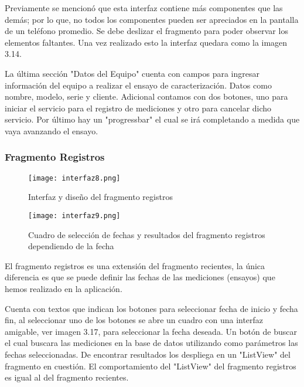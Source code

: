 \par \noindent
Previamente se mencionó que esta interfaz contiene más componentes que las demás; por lo que, no todos los componentes pueden ser apreciados en la pantalla de un teléfono promedio. Se debe deslizar el fragmento para poder observar los elementos faltantes. Una vez realizado esto la interfaz quedara como la imagen 3.14. 

\par \noindent
La última sección "Datos del Equipo" cuenta con campos para ingresar información del equipo a realizar el ensayo de caracterización. Datos como nombre, modelo, serie y cliente. Adicional contamos con dos botones, uno para iniciar el servicio para el registro de mediciones y otro para cancelar dicho servicio. Por último hay un "progressbar" el cual se irá completando a medida que vaya avanzando el ensayo.

\subsubsection{Fragmento Registros}

\begin{figure}[H]
	\centering
	\texttt{[image: interfaz8.png]}
	\caption{Interfaz y diseño del fragmento registros}
\end{figure}

\begin{figure}[H]
	\centering
	\texttt{[image: interfaz9.png]}
	\caption{Cuadro de selección de fechas y resultados del fragmento registros dependiendo de la fecha}
\end{figure}

\par
El fragmento registros es una extensión del fragmento recientes, la única diferencia es que se puede definir las fechas de las mediciones (ensayos) que hemos realizado en la aplicación. 

\par \noindent
Cuenta con textos que indican los botones para seleccionar fecha de inicio y fecha fin, al seleccionar uno de los botones se abre un cuadro con una interfaz amigable, ver imagen 3.17, para seleccionar la fecha deseada. Un botón de buscar el cual buscara las mediciones en la base de datos utilizando como parámetros las fechas seleccionadas. De encontrar resultados los despliega en un "ListView" del fragmento en cuestión. El comportamiento del "ListView" del fragmento registros es igual al del fragmento recientes.

